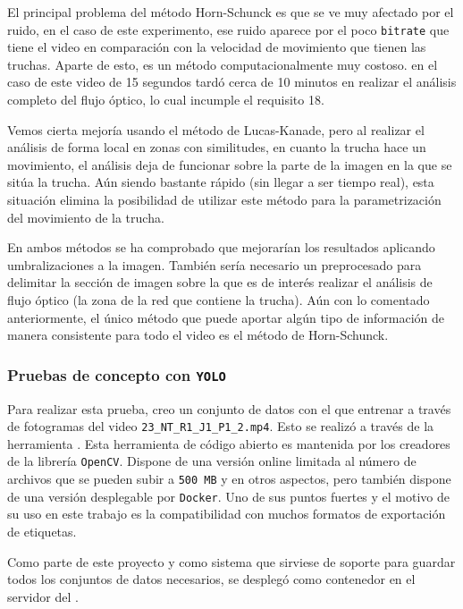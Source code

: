 El principal problema del método Horn-Schunck es que se ve muy afectado por el ruido, en el caso de este experimento, ese ruido aparece por el poco \texttt{bitrate} que tiene el video 
en comparación con la velocidad de movimiento que tienen las truchas. Aparte de esto, es un método computacionalmente muy costoso. en el caso de este video de 15 segundos tardó cerca de 10 
minutos en realizar el análisis completo del flujo óptico, lo cual incumple el requisito 18.

Vemos cierta mejoría usando el método de Lucas-Kanade, pero al realizar el análisis de forma local en zonas con similitudes, en cuanto la trucha hace un movimiento, el análisis deja de funcionar 
sobre la parte de la imagen en la que se sitúa la trucha. Aún siendo bastante rápido (sin llegar a ser tiempo real), esta situación elimina la posibilidad de utilizar este método para la 
parametrización del movimiento de la trucha.

En ambos métodos se ha comprobado que mejorarían los resultados aplicando umbralizaciones a la imagen. También sería necesario un preprocesado para delimitar la sección de 
imagen sobre la que es de interés realizar el análisis de flujo óptico (la zona de la red que contiene la trucha). Aún con lo comentado anteriormente, el único método que puede aportar algún 
tipo de información de manera consistente para todo el video es el método de Horn-Schunck.

\subsubsection{Pruebas de concepto con \texttt{YOLO}}

Para realizar esta prueba, creo un conjunto de datos con el que entrenar a través de fotogramas del video \verb|23_NT_R1_J1_P1_2.mp4|. Esto se realizó a través de la herramienta \texttt{}.\newline
Esta herramienta de código abierto\cite{cvat.aicorporationComputerVisionAnnotation2023} es mantenida por los creadores de la librería \texttt{OpenCV}. Dispone de una versión online limitada al número de 
archivos que se pueden subir a \texttt{500 MB} y en otros aspectos, pero también dispone de una versión desplegable por \texttt{Docker}. Uno de sus puntos fuertes y el motivo de su uso en este trabajo es 
la compatibilidad con muchos formatos de exportación de etiquetas.

Como parte de este proyecto y como sistema que sirviese de soporte para guardar todos los conjuntos de datos necesarios, se desplegó como contenedor en el servidor  del .

